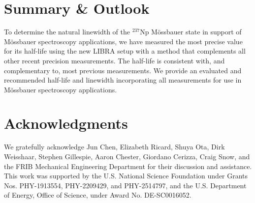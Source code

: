 \documentclass[aps,UTF8,prc,twocolumn,preprintnumbers,amsmath,amssymb,floatfix]{revtex4-2}
\begin{document}
\FloatBarrier
\section{Summary \& Outlook}

To determine the natural linewidth of the $^{237}$Np M\"{o}ssbauer state in support of M\"{o}ssbauer spectroscopy applications, we have measured the most precise value for its half-life using the new LIBRA setup with a method that complements all other recent precision measurements. The half-life is consistent with, and complementary to, most previous measurements. We provide an evaluated and recommended half-life and linewidth incorporating all measurements for use in M\"{o}ssbauer spectroscopy applications. 

\section{Acknowledgments}
We gratefully acknowledge Jun Chen, Elizabeth Ricard, Shuya Ota, Dirk Weisshaar, Stephen Gillespie, Aaron Chester, Giordano Cerizza, Craig Snow, and the FRIB Mechanical Engineering Department for their discussion and assistance. This work was supported by the U.S. National Science Foundation under Grants Nos. PHY-1913554, PHY-2209429, and PHY-2514797, and the U.S. Department of Energy, Office of Science, under Award No. DE-SC0016052.
\end{document}
